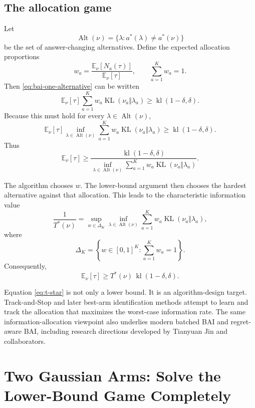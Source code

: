 \documentclass[en,nofont,11pt]{elegantbook}
\newcommand{\E}{\mathbb{E}}
\newcommand{\KL}{\operatorname{KL}}
\newcommand{\kl}{\operatorname{kl}}
\newcommand{\Alt}{\operatorname{Alt}}
\begin{document}
\section{The allocation game}

Let
\[
\Alt(\nu)
=
\{\lambda:a^*(\lambda)\neq a^*(\nu)\}
\]
be the set of answer-changing alternatives. Define the expected allocation proportions
\[
w_a
=
\frac{\E_\nu[N_a(\tau)]}{\E_\nu[\tau]},
\qquad
\sum_{a=1}^{K}w_a=1.
\]
Then \eqref{eq:bai-one-alternative} can be written
\[
\E_\nu[\tau]
\sum_{a=1}^{K}w_a\KL(\nu_a\Vert\lambda_a)
\geq
\kl(1-\delta,\delta).
\]
Because this must hold for every $\lambda\in\Alt(\nu)$,
\[
\E_\nu[\tau]
\inf_{\lambda\in\Alt(\nu)}
\sum_{a=1}^{K}w_a\KL(\nu_a\Vert\lambda_a)
\geq
\kl(1-\delta,\delta).
\]
Thus
\begin{equation}
\E_\nu[\tau]
\geq
\frac{\kl(1-\delta,\delta)}
{\displaystyle
\inf_{\lambda\in\Alt(\nu)}
\sum_{a=1}^{K}w_a\KL(\nu_a\Vert\lambda_a)}.
\label{eq:allocation-specific-lb}
\end{equation}

The algorithm chooses $w$. The lower-bound argument then chooses the hardest alternative against that allocation. This leads to the characteristic information value
\begin{equation}
\boxed{
\frac{1}{T^*(\nu)}
=
\sup_{w\in\Delta_K}
\inf_{\lambda\in\Alt(\nu)}
\sum_{a=1}^{K}w_a\KL(\nu_a\Vert\lambda_a),
}
\label{eq:t-star}
\end{equation}
where
\[
\Delta_K
=
\left\{w\in[0,1]^K:\sum_{a=1}^{K}w_a=1\right\}.
\]
Consequently,
\begin{equation}
\E_\nu[\tau]
\geq
T^*(\nu)\,\kl(1-\delta,\delta).
\label{eq:tstar-lb}
\end{equation}

\begin{researchbox}
Equation \eqref{eq:t-star} is not only a lower bound. It is an algorithm-design target. Track-and-Stop and later best-arm identification methods attempt to learn and track the allocation that maximizes the worst-case information rate. The same information-allocation viewpoint also underlies modern batched BAI and regret-aware BAI, including research directions developed by Tianyuan Jin and collaborators.
\end{researchbox}

\chapter{Two Gaussian Arms: Solve the Lower-Bound Game Completely}
\end{document}
